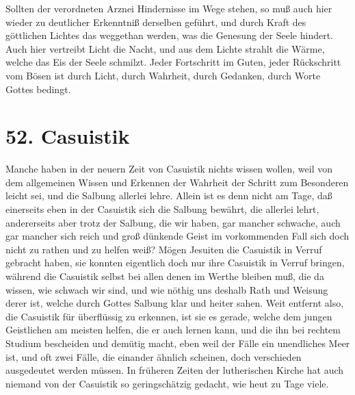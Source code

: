 Sollten der verordneten Arznei Hindernisse im Wege stehen, so muß auch hier wieder zu deutlicher Erkenntniß derselben geführt, und durch Kraft des göttlichen Lichtes das weggethan werden, was die Genesung der Seele hindert. Auch hier vertreibt Licht die Nacht, und aus dem Lichte strahlt die Wärme, welche das Eis der Seele schmilzt. Jeder Fortschritt im Guten, jeder Rückschritt vom Bösen ist durch Licht, durch Wahrheit, durch Gedanken, durch Worte Gottes bedingt.

\section{52. Casuistik}

Manche haben in der neuern Zeit von Casuistik nichts wissen wollen, weil von dem allgemeinen Wissen und Erkennen der Wahrheit der Schritt zum Besonderen leicht sei, und die Salbung allerlei lehre. Allein ist es denn nicht am Tage, daß einerseits eben in der Casuistik sich die Salbung bewährt, die allerlei lehrt, andererseits aber trotz der Salbung, die wir haben, gar mancher schwache, auch gar mancher sich reich und groß dünkende Geist im vorkommenden Fall sich doch nicht zu rathen und zu helfen weiß? Mögen Jesuiten die Casuistik in Verruf gebracht haben, sie konnten eigentlich doch nur ihre Casuistik in Verruf bringen, während die Casuistik selbst bei allen denen im Werthe bleiben muß, die da wissen, wie schwach wir sind, und wie nöthig uns deshalb Rath und Weisung derer ist, welche durch Gottes Salbung klar und heiter sahen. Weit entfernt also, die Casuistik für überflüssig zu erkennen, ist sie es gerade, welche dem jungen Geistlichen am meisten helfen, die er auch lernen kann, und
die ihn bei rechtem Studium bescheiden und demütig macht, eben weil der Fälle ein unendliches Meer ist, und oft zwei Fälle, die einander ähnlich scheinen, doch verschieden ausgedeutet werden müssen. In früheren Zeiten der lutherischen Kirche hat auch niemand von der Casuistik so geringschätzig gedacht, wie heut zu Tage viele.

